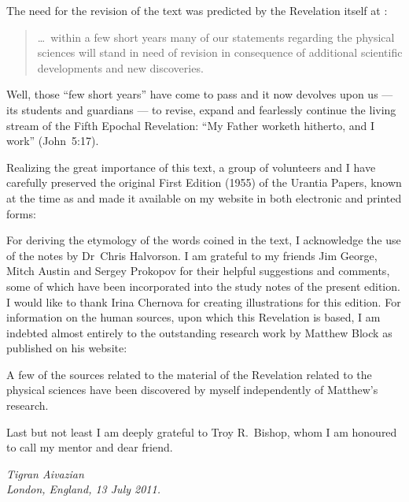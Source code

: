 The need for the revision of the text was predicted by the Revelation itself at :
\begin{quote}
\ldots\ within a few short years many of our statements regarding the physical sciences will stand in need of revision in consequence of additional scientific developments and new discoveries.
\end{quote}
Well, those ``few short years'' have come to pass and it now devolves upon us --- its students and guardians --- to revise,
expand and fearlessly continue the living stream of the Fifth Epochal Revelation:
``My Father worketh hitherto, and I work'' (John~5:17).

Realizing the great importance of this text, a group of volunteers and I have carefully preserved
the original First Edition (1955) of the Urantia Papers, known at the time as 
and made it available on my website in both electronic and printed forms:
\begin{center}\end{center}
For deriving the etymology of the words coined in the text,
I acknowledge the use of the notes by Dr~Chris Halvorson.
I am grateful to my friends Jim George, Mitch Austin and Sergey Prokopov
for their helpful suggestions and comments,
some of which have been incorporated into the study notes of the present edition.
I would like to thank Irina Chernova for creating illustrations for this edition.
For information on the human sources, upon which this Revelation is based,
I am indebted almost entirely to the outstanding
research work by Matthew Block as published on his website:
\begin{center}\end{center}
A few of the sources related to the material of the Revelation related to the physical sciences
have been discovered by myself independently of Matthew's research.

Last but not least I am deeply grateful to Troy R.~Bishop,
whom I am honoured to call my mentor and dear friend.



\begin{flushleft}
\itshape
Tigran Aivazian\\
London, England, 13 July 2011.\\
\end{flushleft}
